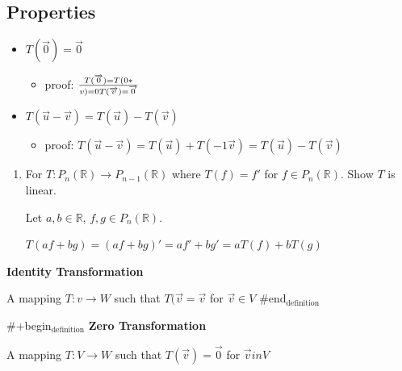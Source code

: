 \documentclass[11pt]{article}
\begin{document}
\subsection{Properties}
\label{sec:orgheadline11}
\begin{itemize}
\item \(T(\overrightarrow{0}) = \overrightarrow{0}\)
\begin{itemize}
\item proof: \(T(\overrightarrow{0}) = T(0*\over{v}) = 0T(\overrightarrow{v}) = \overrightarrow{0}\)
\end{itemize}
\item \(T(\overrightarrow{u} - \overrightarrow{v}) = T(\overrightarrow{u}) - T(\overrightarrow{v})\)
\begin{itemize}
\item proof: \(T(\overrightarrow{u} - \overrightarrow{v}) = T(\overrightarrow{u}) + T(-1 \overrightarrow{v}) = T(\overrightarrow{u}) - T(\overrightarrow{v})\)
\end{itemize}
\end{itemize}

\begin{examples}
\begin{enumerate}
\item For \(T:P_n(\mathbb{R}) \rightarrow P_{n-1}(\mathbb{R})\) where \(T(f) = f'\) for \(f \in P_n(\mathbb{R})\).  Show \(T\) is linear.

Let \(a,b \in \mathbb{R}\), \(f,g \in P_n(\mathbb{R})\).

\(T(af + bg) = (af + bg)' = af' + bg' = aT(f) + bT(g)\)
\end{enumerate}
\end{examples}

\begin{definition}
\textbf{Identity Transformation}

A mapping \(T:v \rightarrow W\) such that \(T(\overrightarrow{v} = \overrightarrow{v}\) for \(\overrightarrow{v} \in V\)
\#end\(_{\text{definition}}\)

\#+begin\(_{\text{definition}}\)
\textbf{Zero Transformation}

A mapping \(T:V \rightarrow W\) such that \(T(\overrightarrow{v}) = \overrightarrow{0}\) for \(\overrightarrow{v} in V\)
\end{definition}
\end{document}

